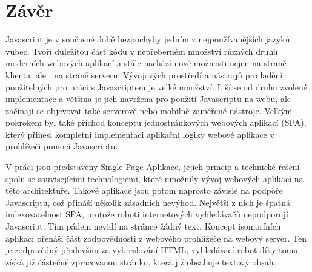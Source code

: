 \chapter{Závěr}
Javascript je v současné době bezpochyby jedním z nejpoužívanějších jazyků vůbec. Tvoří důležitou část kódu v nepřeberném množství různých druhů moderních webových aplikací a stále nachází nové možnosti nejen na straně klienta, ale i na straně serveru. Vývojových prostředí a nástrojů pro ladění použitelných pro práci s Javascriptem je velké množství. Liší se od druhu zvolené implementace a většina je jich navržena pro použití Javascriptu na webu, ale začínají se objevovat také serverově nebo mobilně zaměřené nástroje. Velkým pokrokem byl také příchod konceptu jednostránkových webových aplikací (SPA), který přinesl kompletní implementaci aplikační logiky webové aplikace v prohlížeči pomocí Javascriptu.

V práci jsou představeny Single Page Aplikace, jejich princip a technické řešení spolu se souvisejícími technologiemi, které umožnily vývoj webových aplikací na této architektuře. Takové aplikace jsou potom naprosto závislé na podpoře Javascriptu, což přináší několik zásadních nevýhod. Největší z nich je špatná indexovatelnost SPA, protože roboti internetových vyhledávačů nepodporují Javascript. Tím pádem nevidí na stránce žádný text. Koncept isomorfních aplikací přenáší část zodpovědnosti z webového prohlížeče na webový server. Ten je zodpovědný především za vykreslování HTML, vyhledávací robot díky tomu získá již částečně zpracovanou stránku, která již obsahuje textový obsah. 

